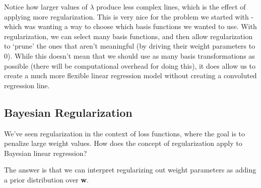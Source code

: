 Notice how larger values of $\lambda$ produce less complex lines, which is the effect of applying more regularization. This is very nice for the problem we started with - which was wanting a way to choose which basis functions we wanted to use. With regularization, we can select many basis functions, and then allow regularization to `prune' the ones that aren't meaningful (by driving their weight parameters to 0). While this doesn't mean that we should use as many basis transformations as possible (there will be computational overhead for doing this), it does allow us to create a much more flexible linear regression model without creating a convoluted regression line.

\subsection{Bayesian Regularization} \label{bayesian-regularization-section}
We've seen regularization in the context of loss functions, where the goal is to penalize large weight values. How does the concept of regularization apply to Bayesian linear regression?

The answer is that we can interpret regularizing out weight parameters as adding a prior distribution over \textbf{w}.

